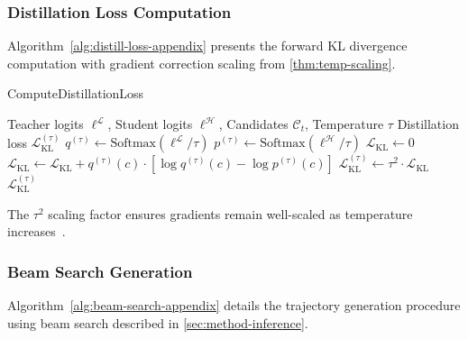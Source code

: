 \subsubsection{Distillation Loss Computation}
\label{app:distill-loss-alg}

Algorithm~\ref{alg:distill-loss-appendix} presents the forward KL divergence computation with gradient correction scaling from \autoref{thm:temp-scaling}.

\begin{algorithm}[H]
    \caption{ComputeDistillationLoss}
    \label{alg:distill-loss-appendix}
    \begin{algorithmic}
        \Require Teacher logits $\boldsymbol{\ell}^{\mathcal{L}}$, Student logits $\boldsymbol{\ell}^{\mathcal{H}}$, Candidates $\mathcal{C}_t$, Temperature $\tau$
        \Ensure Distillation loss $\mathcal{L}_{\text{KL}}^{(\tau)}$
        \State $q^{(\tau)} \gets \text{Softmax}(\boldsymbol{\ell}^{\mathcal{L}} / \tau)$ 
        \State $p^{(\tau)} \gets \text{Softmax}(\boldsymbol{\ell}^{\mathcal{H}} / \tau)$ 
        \State $\mathcal{L}_{\text{KL}} \gets 0$
         
        \State $\mathcal{L}_{\text{KL}} \gets \mathcal{L}_{\text{KL}} + q^{(\tau)}(c) \cdot [\log q^{(\tau)}(c) - \log p^{(\tau)}(c)]$
        \EndIf
        \EndFor
        \State $\mathcal{L}_{\text{KL}}^{(\tau)} \gets \tau^2 \cdot \mathcal{L}_{\text{KL}}$ 
        \State \Return $\mathcal{L}_{\text{KL}}^{(\tau)}$
    \end{algorithmic}
\end{algorithm}

The $\tau^2$ scaling factor ensures gradients remain well-scaled as temperature increases~\cite{hintonDistillingKnowledgeNeural2015}.


\subsubsection{Beam Search Generation}
\label{app:beam-search-alg}

Algorithm~\ref{alg:beam-search-appendix} details the trajectory generation procedure using beam search described in \autoref{sec:method-inference}.


